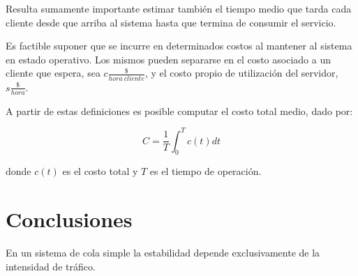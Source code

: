 \documentclass{sig-alternate}
\begin{document}

Resulta sumamente importante estimar tambi\'{e}n el tiempo medio que tarda
cada cliente desde que arriba al sistema hasta que termina de consumir el
servicio. 


Es factible suponer que se incurre en determinados costos al mantener al
sistema en estado operativo. Los mismos pueden separarse en el costo
asociado a un cliente que espera, sea $c\frac{\$}{hora\ cliente}$, y el costo
propio de utilizaci\'{o}n del servidor, $s\frac{\$}{hora}$.

A partir de estas definiciones es posible computar el costo total medio, dado 
por:

\begin{equation}
\label{costo_total_medio}
C = \frac{1}{T} \int_{0}^{T} c(t) dt
\end{equation}

donde $c(t)$ es el costo total y $T$ es el tiempo de operaci\'{o}n.



\section{Conclusiones}\label{conclusiones}

En un sistema de cola simple la estabilidad depende exclusivamente de la
intensidad de tr\'{a}fico.
\end{document}
